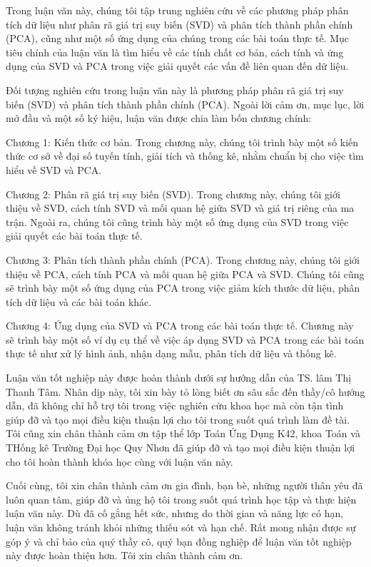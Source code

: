\documentclass[12pt,a4paper,oneside]{report}
\numberwithin{equation}{section}
\begin{document}
{\begin{justify}
Trong luận văn này, chúng tôi tập trung nghiên cứu về các phương pháp phân tích dữ liệu như phân rã giá trị suy biến (SVD) và phân tích thành phần chính (PCA), cũng như một số ứng dụng của chúng trong các bài toán thực tế. Mục tiêu chính của luận văn là tìm hiểu về các tính chất cơ bản, cách tính và ứng dụng của SVD và PCA trong việc giải quyết các vấn đề liên quan đến dữ liệu.

Đối tượng nghiên cứu trong luận văn này là phương pháp phân rã giá trị suy biến (SVD) và phân tích thành phần chính (PCA). Ngoài lời cảm ơn, mục lục, lời mở đầu và một số ký hiệu, luận văn được chia làm bốn chương chính:

Chương 1: Kiến thức cơ bản. Trong chương này, chúng tôi trình bày một số kiến thức cơ sở về đại số tuyến tính, giải tích và thống kê, nhằm chuẩn bị cho việc tìm hiểu về SVD và PCA.

Chương 2: Phân rã giá trị suy biến (SVD). Trong chương này, chúng tôi giới thiệu về SVD, cách tính SVD và mối quan hệ giữa SVD và giá trị riêng của ma trận. Ngoài ra, chúng tôi cũng trình bày một số ứng dụng của SVD trong việc giải quyết các bài toán thực tế.

Chương 3: Phân tích thành phần chính (PCA). Trong chương này, chúng tôi giới thiệu về PCA, cách tính PCA và mối quan hệ giữa PCA và SVD. Chúng tôi cũng sẽ trình bày một số ứng dụng của PCA trong việc giảm kích thước dữ liệu, phân tích dữ liệu và các bài toán khác.

Chương 4: Ứng dụng của SVD và PCA trong các bài toán thực tế. Chương này sẽ trình bày một số ví dụ cụ thể về việc áp dụng SVD và PCA trong các bài toán thực tế như xử lý hình ảnh, nhận dạng mẫu, phân tích dữ liệu và thống kê.

Luận văn tốt nghiệp này được hoàn thành dưới sự hướng dẫn của TS. lâm Thị Thanh Tâm. Nhân dịp này, tôi xin bày tỏ lòng biết ơn sâu sắc đến thầy/cô hướng dẫn, đã không chỉ hỗ trợ tôi trong việc nghiên cứu khoa học mà còn tận tình giúp đỡ và tạo mọi điều kiện thuận lợi cho tôi trong suốt quá trình làm đề tài. Tôi cũng xin chân thành cảm ơn tập thể lớp Toán Ứng Dụng K42, khoa Toán và THống kê Trường Đại học Quy Nhơn đã giúp đỡ và tạo mọi điều kiện thuận lợi cho tôi hoàn thành khóa học cùng với luận văn này.

Cuối cùng, tôi xin chân thành cảm ơn gia đình, bạn bè, những người thân yêu đã luôn quan tâm, giúp đỡ và ủng hộ tôi trong suốt quá trình học tập và thực hiện luận văn này. Dù đã cố gắng hết sức, nhưng do thời gian và năng lực có hạn, luận văn không tránh khỏi những thiếu sót và hạn chế. Rất mong nhận được sự góp ý và chỉ bảo của quý thầy cô, quý bạn đồng nghiệp để luận văn tốt nghiệp này được hoàn thiện hơn. Tôi xin chân thành cảm ơn.
\end{justify}
}
\end{document}
